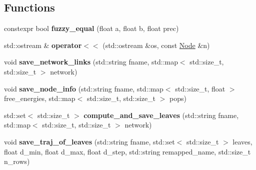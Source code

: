 \subsection*{Functions}
\begin{DoxyCompactItemize}
\item 
\hypertarget{namespaceanonymous__namespace_02network__builder_8cpp_03_ae33930bf9483b81df2dd11a2ff691f7d}{constexpr bool {\bfseries fuzzy\-\_\-equal} (float a, float b, float prec)}\label{namespaceanonymous__namespace_02network__builder_8cpp_03_ae33930bf9483b81df2dd11a2ff691f7d}

\item 
\hypertarget{namespaceanonymous__namespace_02network__builder_8cpp_03_a72d60fbe8f7fd847a5f2226cf3769f25}{std\-::ostream \& {\bfseries operator$<$$<$} (std\-::ostream \&os, const \hyperlink{structanonymous__namespace_02network__builder_8cpp_03_1_1Node}{Node} \&n)}\label{namespaceanonymous__namespace_02network__builder_8cpp_03_a72d60fbe8f7fd847a5f2226cf3769f25}

\item 
\hypertarget{namespaceanonymous__namespace_02network__builder_8cpp_03_a6ee2531084d4c677d388b176e520d614}{void {\bfseries save\-\_\-network\-\_\-links} (std\-::string fname, std\-::map$<$ std\-::size\-\_\-t, std\-::size\-\_\-t $>$ network)}\label{namespaceanonymous__namespace_02network__builder_8cpp_03_a6ee2531084d4c677d388b176e520d614}

\item 
\hypertarget{namespaceanonymous__namespace_02network__builder_8cpp_03_a9e0348e99135309048fa0548b7472d0f}{void {\bfseries save\-\_\-node\-\_\-info} (std\-::string fname, std\-::map$<$ std\-::size\-\_\-t, float $>$ free\-\_\-energies, std\-::map$<$ std\-::size\-\_\-t, std\-::size\-\_\-t $>$ pops)}\label{namespaceanonymous__namespace_02network__builder_8cpp_03_a9e0348e99135309048fa0548b7472d0f}

\item 
\hypertarget{namespaceanonymous__namespace_02network__builder_8cpp_03_a7aabc911496c515ad0da17cdcfb8cdef}{std\-::set$<$ std\-::size\-\_\-t $>$ {\bfseries compute\-\_\-and\-\_\-save\-\_\-leaves} (std\-::string fname, std\-::map$<$ std\-::size\-\_\-t, std\-::size\-\_\-t $>$ network)}\label{namespaceanonymous__namespace_02network__builder_8cpp_03_a7aabc911496c515ad0da17cdcfb8cdef}

\item 
\hypertarget{namespaceanonymous__namespace_02network__builder_8cpp_03_abfb0053723ae09a113bbee244c948391}{void {\bfseries save\-\_\-traj\-\_\-of\-\_\-leaves} (std\-::string fname, std\-::set$<$ std\-::size\-\_\-t $>$ leaves, float d\-\_\-min, float d\-\_\-max, float d\-\_\-step, std\-::string remapped\-\_\-name, std\-::size\-\_\-t n\-\_\-rows)}\label{namespaceanonymous__namespace_02network__builder_8cpp_03_abfb0053723ae09a113bbee244c948391}


\end{DoxyCompactItemize}
